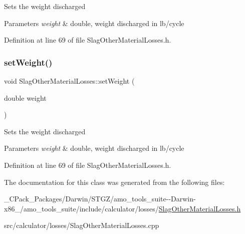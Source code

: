 Sets the weight discharged 
\begin{DoxyParams}{Parameters}
{\em weight} & double, weight discharged in lb/cycle \\
\hline
\end{DoxyParams}


Definition at line 69 of file Slag\+Other\+Material\+Losses.\+h.

\mbox{\label{class_slag_other_material_losses_a230a178f2ead59cd498b620e4bb4910f}} 
\subsubsection{\texorpdfstring{set\+Weight()}{setWeight()}\hspace{0.1cm}{\footnotesize\ttfamily [3/3]}}
{\footnotesize\ttfamily void Slag\+Other\+Material\+Losses\+::set\+Weight (\begin{DoxyParamCaption}\item[{double}]{weight }\end{DoxyParamCaption})\hspace{0.3cm}{\ttfamily [inline]}}

Sets the weight discharged 
\begin{DoxyParams}{Parameters}
{\em weight} & double, weight discharged in lb/cycle \\
\hline
\end{DoxyParams}


Definition at line 69 of file Slag\+Other\+Material\+Losses.\+h.



The documentation for this class was generated from the following files\+:\begin{DoxyCompactItemize}
\item 
\+\_\+\+C\+Pack\+\_\+\+Packages/\+Darwin/\+S\+T\+G\+Z/amo\+\_\+tools\+\_\+suite-\/-\/\+Darwin-\/x86\+\_/amo\+\_\+tools\+\_\+suite/include/calculator/losses/\hyperlink{___c_pack___packages_2_darwin_2_s_t_g_z_2amo__tools__suite--_darwin-x86__64_2amo__tools__suite_2dc0a6fddc3bab53e61620aff16484645}{Slag\+Other\+Material\+Losses.\+h}\item 
src/calculator/losses/Slag\+Other\+Material\+Losses.\+cpp\end{DoxyCompactItemize}

